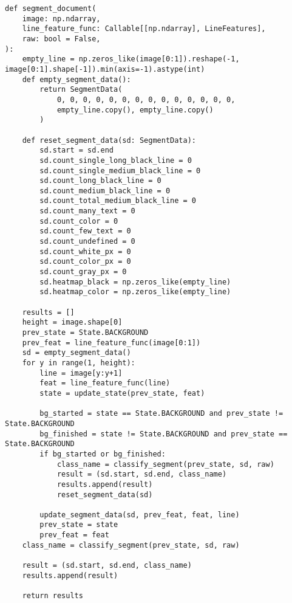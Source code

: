\begin{lstlisting}[caption={Функция для создания первичной или уточненной разметки}, label={lst:sd}]
def segment_document(
    image: np.ndarray,
    line_feature_func: Callable[[np.ndarray], LineFeatures],
    raw: bool = False,
):
    empty_line = np.zeros_like(image[0:1]).reshape(-1, image[0:1].shape[-1]).min(axis=-1).astype(int)
    def empty_segment_data():
        return SegmentData(
            0, 0, 0, 0, 0, 0, 0, 0, 0, 0, 0, 0, 0, 0,
            empty_line.copy(), empty_line.copy()
        )

    def reset_segment_data(sd: SegmentData):
        sd.start = sd.end
        sd.count_single_long_black_line = 0
        sd.count_single_medium_black_line = 0
        sd.count_long_black_line = 0
        sd.count_medium_black_line = 0
        sd.count_total_medium_black_line = 0
        sd.count_many_text = 0
        sd.count_color = 0
        sd.count_few_text = 0
        sd.count_undefined = 0
        sd.count_white_px = 0
        sd.count_color_px = 0
        sd.count_gray_px = 0
        sd.heatmap_black = np.zeros_like(empty_line)
        sd.heatmap_color = np.zeros_like(empty_line)

    results = []
    height = image.shape[0]
    prev_state = State.BACKGROUND
    prev_feat = line_feature_func(image[0:1])
    sd = empty_segment_data()
    for y in range(1, height):
        line = image[y:y+1]
        feat = line_feature_func(line)
        state = update_state(prev_state, feat)

        bg_started = state == State.BACKGROUND and prev_state != State.BACKGROUND
        bg_finished = state != State.BACKGROUND and prev_state == State.BACKGROUND
        if bg_started or bg_finished:
            class_name = classify_segment(prev_state, sd, raw)
            result = (sd.start, sd.end, class_name)
            results.append(result)
            reset_segment_data(sd)

        update_segment_data(sd, prev_feat, feat, line)
        prev_state = state
        prev_feat = feat
    class_name = classify_segment(prev_state, sd, raw)

    result = (sd.start, sd.end, class_name)
    results.append(result)

    return results
\end{lstlisting}

